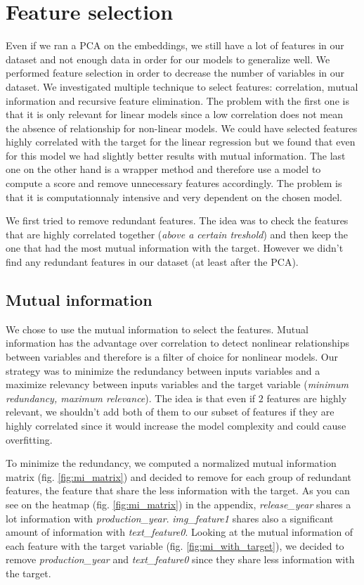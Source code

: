 \section{Feature selection}

Even if we ran a PCA on the embeddings, we still have a lot of features in our dataset and not enough data in order for our models to generalize well. We performed feature selection in order to decrease the number of variables in our dataset. We investigated multiple technique to select features: correlation, mutual information and recursive feature elimination. The problem with the first one is that it is only relevant for linear models since a low correlation does not mean the absence of relationship for non-linear models. We could have selected features highly correlated with the target for the linear regression but we found that even for this model we had slightly better results with mutual information. The last one on the other hand is a wrapper method and therefore use a model to compute a score and remove unnecessary features accordingly. The problem is that it is computationnaly intensive and very dependent on the chosen model.

We first tried to remove redundant features. The idea was to check the features that are highly correlated together (\textit{above a certain treshold}) and then keep the one that had the most mutual information with the target. However we didn't find any redundant features in our dataset (at least after the PCA).

\subsection{Mutual information}

We chose to use the mutual information to select the features. Mutual information has the advantage over correlation to detect nonlinear relationships between variables and therefore is a filter of choice for nonlinear models. Our strategy was to minimize the redundancy between inputs variables and a maximize relevancy between inputs variables and the target variable (\textit{minimum redundancy, maximum relevance}). The idea is that even if $2$ features are highly relevant, we shouldn't add both of them to our subset of features if they are highly correlated since it would increase the model complexity and could cause overfitting.

To minimize the redundancy, we computed a normalized mutual information matrix (fig. \ref{fig:mi_matrix}) and decided to remove for each group of redundant features, the feature that share the less information with the target. As you can see on the heatmap (fig. \ref{fig:mi_matrix}) in the appendix, \textit{release\_year} shares a lot information with \textit{production\_year}. \textit{img\_feature1} shares also a significant amount of information with \textit{text\_feature0}. Looking at the mutual information of each feature with the target variable (fig. \ref{fig:mi_with_target}), we decided to remove \textit{production\_year} and \textit{text\_feature0} since they share less information with the target.

